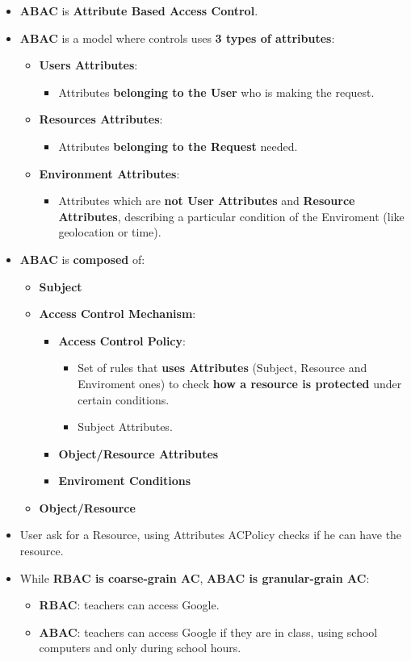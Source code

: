 \documentclass[9pt, letterpaper]{article}
\begin{document}
\begin{itemize}
	\item \textbf{ABAC} is \textbf{Attribute Based Access Control}.
	\item \textbf{ABAC} is a model where controls uses \textbf{3 types of attributes}:
	\begin{itemize}
		\item \textbf{Users Attributes}:
		\begin{itemize}
			\item Attributes \textbf{belonging to the User} who is making the request.
		\end{itemize}
		\item \textbf{Resources Attributes}:
		\begin{itemize}
			\item Attributes \textbf{belonging to the Request} needed.
		\end{itemize}
		\item \textbf{Environment Attributes}:
		\begin{itemize}
			\item Attributes which are \textbf{not User Attributes} and \textbf{Resource Attributes}, describing a particular condition of the Enviroment (like geolocation or time).
		\end{itemize}
	\end{itemize}
	\item \textbf{ABAC} is \textbf{composed} of:
	\begin{itemize}
		\item \textbf{Subject}
		\item \textbf{Access Control Mechanism}:
		\begin{itemize}
			\item \textbf{Access Control Policy}: 
			\begin{itemize}
				\item Set of rules that \textbf{uses Attributes} (Subject, Resource and Enviroment ones) to check \textbf{how a resource is protected} under certain conditions.
				\item Subject Attributes.
			\end{itemize}			 
			\item \textbf{Object/Resource Attributes}
			\item \textbf{Enviroment Conditions}
		\end{itemize}
		\item \textbf{Object/Resource}
	\end{itemize}
	\item User ask for a Resource, using Attributes ACPolicy checks if he can have the resource.
	\item While \textbf{RBAC is coarse-grain AC}, \textbf{ABAC is granular-grain AC}:
	\begin{itemize}
		\item \textbf{RBAC}: teachers can access Google.
		\item \textbf{ABAC}: teachers can access Google if they are in class, using school computers and only during school hours.
	\end{itemize}
\end{itemize}
\end{document}
